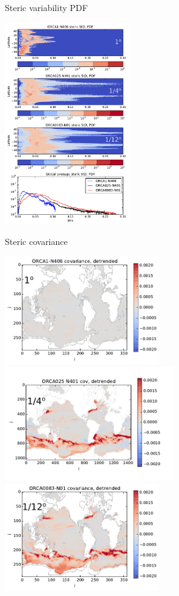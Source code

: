 \documentclass{beamer}
\begin{document}
\begin{frame}{Steric variability PDF}
\vspace{-10}
\begin{center}
 \includegraphics[width=0.4\textwidth]{PDF_SH_stdCutP.png}
\end{center} 
\end{frame}

\begin{frame}{Steric covariance}
\begin{center}
\vspace{-0.9cm}
\includegraphics[width=0.5\textwidth]{ORCA1_covP.png}
\includegraphics[width=0.55\textwidth]{ORCA025_N401_cov_detrendedMarch2015P.png}\\
\vspace{-0.4cm}
\includegraphics[width=0.5\textwidth]{ORCA12_covP.png}
\end{center}
\end{frame}
\end{document}
